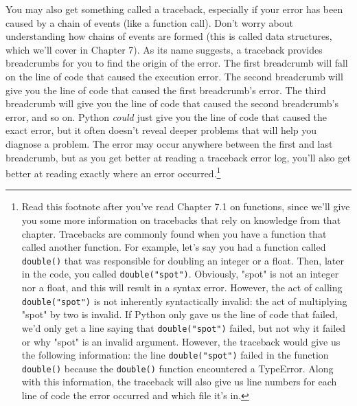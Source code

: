 You may also get something called a traceback, especially if your error has been caused by a chain of events (like a function call). Don't worry about understanding how chains of events are formed (this is called data structures, which we'll cover in Chapter 7). As its name suggests, a traceback provides breadcrumbs for you to find the origin of the error. The first breadcrumb will fall on the line of code that caused the execution error. The second breadcrumb will give you the line of code that caused the first breadcrumb's error. The third breadcrumb will give you the line of code that caused the second breadcrumb's error, and so on. Python \textit{could} just give you the line of code that caused the exact error, but it often doesn't reveal deeper problems that will help you diagnose a problem. The error may occur anywhere between the first and last breadcrumb, but as you get better at reading a traceback error log, you'll also get better at reading exactly where an error occurred.\cprotect\footnote{Read this footnote after you've read Chapter 7.1 on functions, since we'll give you some more information on tracebacks that rely on knowledge from that chapter. Tracebacks are commonly found when you have a function that called another function. For example, let's say you had a function called \verb|double()| that was responsible for doubling an integer or a float. Then, later in the code, you called \verb|double("spot")|. Obviously, "spot" is not an integer nor a float, and this will result in a syntax error. However, the act of calling \verb|double("spot")| is not inherently syntactically invalid: the act of multiplying "spot" by two is invalid. If Python only gave us the line of code that failed, we'd only get a line saying that \verb|double("spot")| failed, but not why it failed or why "spot" is an invalid argument. However, the traceback would give us the following information: the line \verb|double("spot")| failed in the function \verb|double()| because the \verb|double()| function encountered a TypeError. Along with this information, the traceback will also give us line numbers for each line of code the error occurred and which file it's in.}\par
{}
